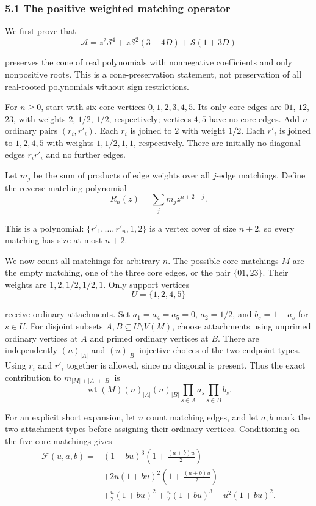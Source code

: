 \documentclass[
  11pt,
  a4paper,
]{article}
\begin{document}
\subsubsection{5.1 The positive weighted matching
operator}\label{the-positive-weighted-matching-operator}

We first prove that
\nopagebreak
\[
\mathcal A=z^2\mathcal S^4
+z\mathcal S^2(3+4D)+\mathcal S(1+3D)\tag{30}
\]

preserves the cone of real polynomials with nonnegative coefficients and
only nonpositive roots. This is a cone-preservation statement, not
preservation of all real-rooted polynomials without sign restrictions.

For \(n\geq0\), start with six core vertices \(0,1,2,3,4,5\). Its only
core edges are \(01\), \(12\), \(23\), with weights \(2\), \(1/2\),
\(1/2\), respectively; vertices \(4,5\) have no core edges. Add \(n\)
ordinary pairs \((r_i,r'_i)\). Each \(r_i\) is joined to \(2\) with
weight \(1/2\). Each \(r'_i\) is joined to \(1,2,4,5\) with weights
\(1,1/2,1,1\), respectively. There are initially no diagonal edges
\(r_ir'_i\) and no further edges.

Let \(m_j\) be the sum of products of edge weights over all \(j\)-edge
matchings. Define the reverse matching polynomial
\nopagebreak
\[
R_n(z)=\sum_jm_jz^{n+2-j}.
\]

This is a polynomial: \(\{r'_1,\ldots,r'_n,1,2\}\) is a vertex cover of
size \(n+2\), so every matching has size at most \(n+2\).

We now count all matchings for arbitrary \(n\). The possible core
matchings \(M\) are the empty matching, one of the three core edges, or
the pair \(\{01,23\}\). Their weights are \(1,2,1/2,1/2,1\). Only
support vertices
\nopagebreak
\[
U=\{1,2,4,5\}
\]

receive ordinary attachments. Set \(a_1=a_4=a_5=0\), \(a_2=1/2\), and
\(b_s=1-a_s\) for \(s\in U\). For disjoint subsets
\(A,B\subseteq U\setminus V(M)\), choose attachments using unprimed
ordinary vertices at \(A\) and primed ordinary vertices at \(B\). There
are independently \((n)_{|A|}\) and \((n)_{|B|}\) injective choices of
the two endpoint types. Using \(r_i\) and \(r'_i\) together is allowed,
since no diagonal is present. Thus the exact contribution to
\(m_{|M|+|A|+|B|}\) is
\nopagebreak
\[
\operatorname{wt}(M)(n)_{|A|}(n)_{|B|}
\prod_{s\in A}a_s\prod_{s\in B}b_s.\tag{31}
\]

For an explicit short expansion, let \(u\) count matching edges, and let
\(a,b\) mark the two attachment types before assigning their ordinary
vertices. Conditioning on the five core matchings gives
\nopagebreak
\[
\begin{aligned}
\mathcal F(u,a,b)={}&(1+bu)^3\left(1+\frac{(a+b)u}{2}\right)\\
&+2u(1+bu)^2\left(1+\frac{(a+b)u}{2}\right)\\
&+\frac u2(1+bu)^2+\frac u2(1+bu)^3
+u^2(1+bu)^2.
\end{aligned}\tag{32}
\]
\end{document}
